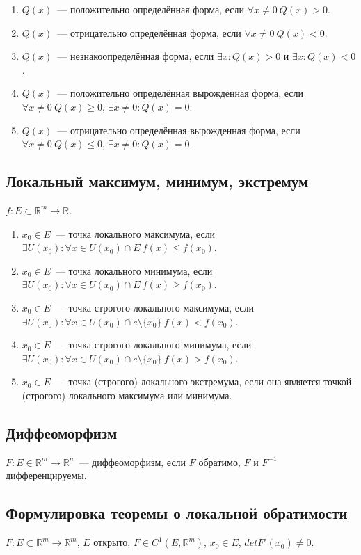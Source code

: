 \documentclass[paper=a4, fontsize=11pt]{article}
\begin{document}
\begin{enumerate}
    \item $Q(x)$~--- положительно определённая форма, если $\forall x \neq 0\ Q(x) > 0$.
    \item $Q(x)$~--- отрицательно определённая форма, если $\forall x \neq 0\ Q(x) < 0$.
    \item $Q(x)$~--- незнакоопределённая форма, если $\exists x: Q(x) > 0$ и $\exists x: Q(x) < 0$.
    \item $Q(x)$~--- положительно определённая вырожденная форма, если $\forall x \neq 0\ Q(x) \geq 0$, $\exists x \neq 0: Q(x)=0$.
    \item $Q(x)$~--- отрицательно определённая вырожденная форма, если $\forall x \neq 0\ Q(x) \leq 0$, $\exists x \neq 0: Q(x)=0$.
\end{enumerate}

\subsection{Локальный максимум, минимум, экстремум}
$f: E \subset \mathds{R}^m \rightarrow \mathds{R}$.
\begin{enumerate}
    \item $x_0 \in E$~--- точка локального максимума, если $\exists U(x_0): \forall x \in U(x_0) \cap E\ f(x) \leq f(x_0)$.
    \item $x_0 \in E$~--- точка локального минимума, если $\exists U(x_0): \forall x \in U(x_0) \cap E\ f(x) \geq f(x_0)$.
    \item $x_0 \in E$~--- точка строгого локального максимума, если
        $\exists U(x_0): \forall x \in U(x_0) \cap e \setminus\{x_0\}\ f(x) < f(x_0)$.
    \item $x_0 \in E$~--- точка строгого локального минимума, если
        $\exists U(x_0): \forall x \in U(x_0) \cap e \setminus\{x_0\}\ f(x) > f(x_0)$.
    \item $x_0 \in E$~--- точка (строгого) локального экстремума, если она является точкой (строгого) локального максимума или минимума.
\end{enumerate}

\subsection{Диффеоморфизм}
$F: E \in \mathds{R}^m \rightarrow \mathds{R}^n$~--- диффеоморфизм, если $F$ обратимо, $F$ и $F^{-1}$ дифференцируемы.

\subsection{Формулировка теоремы о локальной обратимости}
$F: E \subset \mathds{R}^m \rightarrow \mathds{R}^m$, $E$ открыто, $F \in C^1(E,\mathds{R}^m)$, $x_0 \in E$, $det F'(x_0) \neq 0$.
\end{document}
